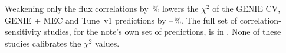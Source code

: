 Weakening only the flux correlations by \,\% lowers the $\chi^2$ of the GENIE CV, GENIE + MEC and Tune~v1 predictions by --\,\%. The full set of correlation-sensitivity studies, for the note's own set of predictions, is in . None of these studies calibrates the $\chi^2$ values.

